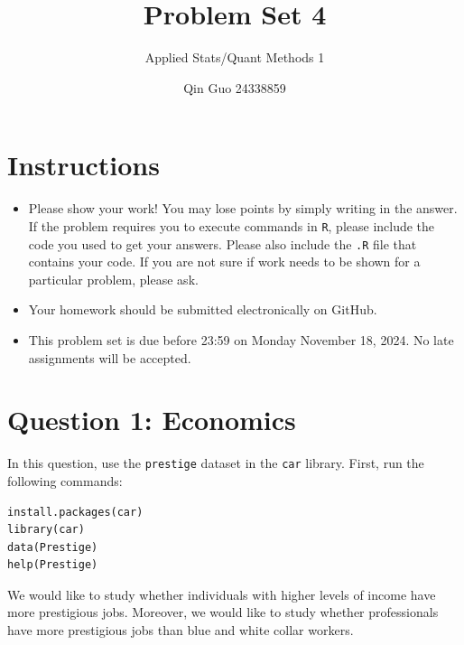 \documentclass[12pt,letterpaper]{article}
\title{Problem Set 4}
\date{Qin Guo 24338859}
\author{Applied Stats/Quant Methods 1}
\begin{document}
	\maketitle
	\section*{Instructions}
	\begin{itemize}
		\item Please show your work! You may lose points by simply writing in the answer. If the problem requires you to execute commands in \texttt{R}, please include the code you used to get your answers. Please also include the \texttt{.R} file that contains your code. If you are not sure if work needs to be shown for a particular problem, please ask.
		\item Your homework should be submitted electronically on GitHub.
		\item This problem set is due before 23:59 on Monday November 18, 2024. No late assignments will be accepted.
	\end{itemize}



	\vspace{.5cm}
\section*{Question 1: Economics}
\vspace{.25cm}
\noindent 	
In this question, use the \texttt{prestige} dataset in the \texttt{car} library. First, run the following commands:

\begin{verbatim}
install.packages(car)
library(car)
data(Prestige)
help(Prestige)
\end{verbatim} 


\noindent We would like to study whether individuals with higher levels of income have more prestigious jobs. Moreover, we would like to study whether professionals have more prestigious jobs than blue and white collar workers.
\end{document}
